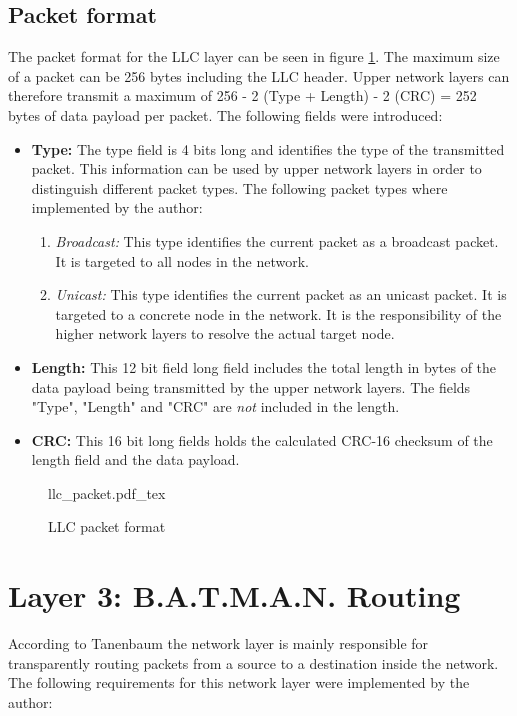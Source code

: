 \subsection{Packet format}%
The packet format for the LLC layer can be seen in figure \ref{fig:llc_format}. The maximum size of a packet can be 256 bytes including the LLC header. Upper network layers can therefore transmit a maximum of 256 - 2 (Type + Length) - 2 (CRC) = 252 bytes of data payload per packet. The following fields were introduced:
\begin{itemize}
    \item \textbf{Type:} The type field is 4 bits long and identifies the type of the transmitted packet. This information can be used by upper network layers in order to distinguish different packet types. The following packet types where implemented by the author:
\begin{enumerate}
    \item \emph{Broadcast:} This type identifies the current packet as a broadcast packet. It is targeted to all nodes in the network.
    \item \emph{Unicast:} This type identifies the current packet as an unicast packet. It is targeted to a concrete node in the network. It is the responsibility of the higher network layers to resolve the actual target node.
\end{enumerate}
    \item \textbf{Length:} This 12 bit field long field includes the total length in bytes of the data payload being transmitted by the upper network layers. The fields "Type", "Length" and "CRC" are \emph{not} included in the length.
    \item \textbf{CRC:} This 16 bit long fields holds the calculated CRC-16 checksum of the length field and the data payload.
\end{itemize}

\begin{figure}[H]
    \centering
    {llc_packet.pdf_tex}
    \caption{LLC packet format}
    \label{fig:llc_format}
\end{figure}

\section{Layer 3: B.A.T.M.A.N. Routing}%
According to Tanenbaum the network layer is mainly responsible for transparently routing packets from a source to a destination inside the network. The following requirements for this network layer were implemented by the author:

